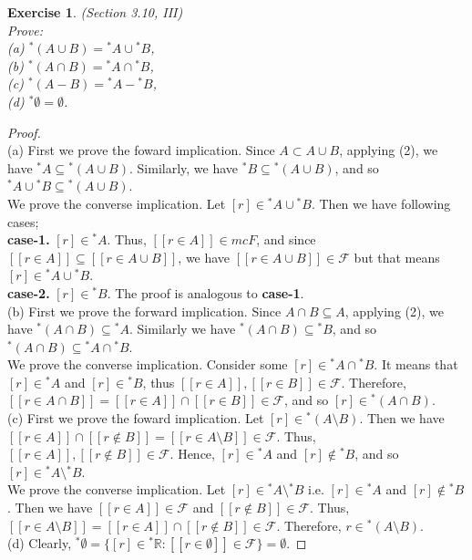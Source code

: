 \documentclass[a4paper, 11pt]{book}
\theoremstyle{plain}
\newtheorem{exercise}{Exercise}[chapter]
\theoremstyle{plain}
\newcommand{\mc}{\mathcal}
\newcommand{\R}{\mathbb{R}}
\newcommand{\hyp}{{}^*}
\begin{document}
  \begin{exercise}
    (Section 3.10, III) \\
    Prove: \\
    (a) ${}^* (A \cup B) = {}^* A \cup {}^* B$, \\
    (b) ${}^* (A \cap B)= {}^* A \cap {}^* B$, \\
    (c) $\hyp (A-B)=\hyp A - \hyp B$, \\
    (d) $\hyp \emptyset =\emptyset$.
  \end{exercise}
  \begin{proof} $ $ \\
    (a) First we prove the foward implication. Since $A \subset A \cup B$, applying (2), we have ${}^* A \subseteq {}^* (A \cup B)$. Similarly, we have ${}^* B \subseteq {}^* (A \cup B)$, and so ${}^* A \cup {}^* B \subseteq {}^* (A \cup B)$. \\
    We prove the converse implication. Let $[r] \in {}^* A \cup {}^* B$. Then we have following cases; \\
    \textbf{case-1.} $[r] \in {}^* A$. Thus, $[[r \in A]] \in mc{F}$, and since $[[r \in A]] \subseteq [[r \in A \cup B]]$, we have $[[r \in A \cup B]] \in \mc{F}$ but that means $[r] \in {}^* A \cup {}^* B$. \\
    \textbf{case-2.} $[r] \in {}^* B$. The proof is analogous to \textbf{case-1}. \\

    (b) First we prove the forward implication. Since $A \cap B \subseteq A$, applying (2), we have ${}^* (A \cap B) \subseteq {}^* A$. Similarly we have $\hyp (A \cap B) \subseteq \hyp B$, and so $\hyp (A \cap B) \subseteq \hyp A \cap \hyp B$. \\
    We prove the converse implication. Consider some $[r] \in \hyp A \cap \hyp B$. It means that $[r] \in \hyp A$ and $[r] \in \hyp B$, thus $[[r \in A]], [[r \in B]] \in \mc{F}$. Therefore, $[[r \in A \cap B]]=[[r \in A]] \cap [[r \in B]] \in \mc{F}$, and so $[r] \in \hyp (A \cap B)$.  \\

    (c) First we prove the foward implication. Let $[r] \in \hyp (A \setminus B)$. Then we have $[[r \in A]] \cap [[r \notin B]]=[[r \in A \setminus B]] \in \mc{F}$. Thus, $[[r \in A]], [[r \notin B]] \in \mc{F}$. Hence, $[r] \in \hyp A$ and $[r] \notin \hyp B$, and so $[r] \in \hyp A \setminus \hyp B$. \\
    We prove the converse implication. Let $[r] \in \hyp A \setminus \hyp B$ i.e. $[r] \in \hyp A$ and $[r] \notin \hyp B$. Then we have $[[r \in A]] \in \mc{F}$ and $[[r \notin B]] \in \mc{F}$. Thus, $[[r \in A \setminus B]]=[[r \in A]] \cap [[r \notin B]] \in \mc{F}$. Therefore, $r \in \hyp (A \setminus B)$. \\

    (d) Clearly, $\hyp \emptyset =\{ [r] \in \hyp \R: [[r \in \emptyset]] \in \mc{F}\}=\emptyset$. 
  \end{proof}
\end{document}
